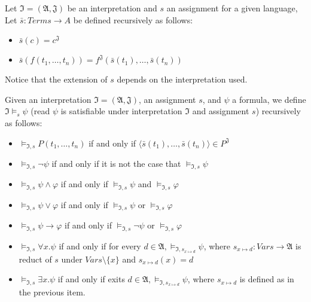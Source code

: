\begin{definition}
  Let $\mathfrak{I} = (\mathfrak{A}, \mathfrak{J})$ be an interpretation and $s$ an assignment for a given language,
  Let $\bar{s} : Terms \rightarrow A$ be defined recursively as follows:
  \begin{itemize}
    \item $\bar{s}(c) = c^\mathfrak{J}$
    \item $\bar{s}(f(t_1, \dots, t_n)) = f^\mathfrak{J}(\bar{s}(t_1), \dots, \bar{s}(t_n))$
  \end{itemize}
\end{definition}

Notice that the extension of $s$ depends on the interpretation used.

\begin{definition}
  Given an interpretation $\mathfrak{I} = (\mathfrak{A}, \mathfrak{J})$, an assignment $s$, and $\psi$ a formula, we define $\mathfrak{I} \models_s \psi$ (read $\psi$ is satisfiable under interpretation $\mathfrak{I}$ and assignment $s$) recursively as follows:
  \begin{itemize}
    \item $\models_{\mathfrak{I}, s} P(t_1, \dots, t_n)$ 
      if and only if 
      $\langle
      \bar{s}(t_1), \dots, \bar{s}(t_n) \rangle 
      \in P^{\mathfrak{J}}$
    \item $\models_{\mathfrak{I}, s} \neg \psi$ if and only if  it is not the case that $\models_{\mathfrak{I}, s}   \psi$
    \item $\models_{\mathfrak{I}, s} \psi \land \varphi$ if and only if $\models_{\mathfrak{I}, s}  \psi$ and $   \models_{\mathfrak{I}, s}  \varphi$
    \item $   \models_{\mathfrak{I}, s}  \psi \lor \varphi$ if and only if $   \models_{\mathfrak{I}, s}  \psi$ or $   \models_{\mathfrak{I}, s}  \varphi$
    \item $   \models_{\mathfrak{I}, s}  \psi \rightarrow \varphi$ if and only if $   \models_{\mathfrak{I}, s}  \neg \psi$ or $   \models_{\mathfrak{I}, s}  \varphi$
    \item $   \models_{\mathfrak{I}, s}  \forall x . \psi$ if and only if for every $d \in \mathfrak{A},    \models_{\mathfrak{I}, s_{x \mapsto d}} \psi$, where $s_{x \mapsto d} : Vars \rightarrow \mathfrak{A}$ is reduct of $s$ under $Vars \setminus \{x\}$ and $s_{x \mapsto d}(x) = d$
    \item $   \models_{\mathfrak{I}, s}  \exists x . \psi$ if and only if exits $d \in \mathfrak{A},    \models_{\mathfrak{I}, s_{x \mapsto d}} \psi$, where $s_{x \mapsto d}$ is defined as in the previous item.
  \end{itemize}


\end{definition}
